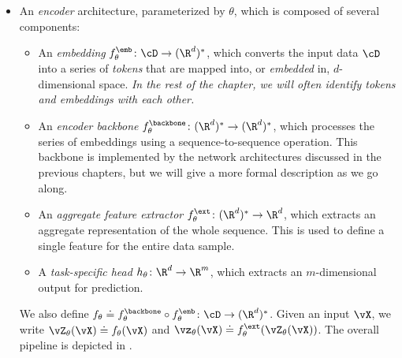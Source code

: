 \documentclass[../../book-main.tex]{subfiles}
\begin{document}
\begin{itemize}
    \item An \textit{encoder} architecture, parameterized by
        \(\theta\), which is composed of several components:
        \begin{itemize}
            \item An \textit{embedding} \(f_{\theta}^{\emb} \colon
                \cD \to (\R^{d})^{*}\), which converts the input data
                \(\cD\) into a series of \textit{tokens} that are
                mapped into, or \textit{embedded} in,
                \(d\)-dimensional space. \textit{In the rest of the
                    chapter, we will often identify tokens and embeddings
                with each other.}
            \item An \textit{encoder backbone}
                \(f_{\theta}^{\backbone} \colon (\R^{d})^{*} \to
                (\R^{d})^{*}\), 
                which processes the series of
                embeddings using a sequence-to-sequence operation.
                This backbone is implemented by the network
                architectures discussed in the previous chapters, but
                we will give a more formal description as we go along.
            \item An \textit{aggregate feature extractor}
                \(f_{\theta}^{\ext} \colon (\R^{d})^{*} \to \R^{d}\),
                which extracts an aggregate representation of the
                whole sequence. This is used to define a single
                feature for the entire data sample.
            \item A \textit{task-specific head} \(h_{\theta} \colon
                \R^{d} \to \R^{m}\), which extracts an
                \(m\)-dimensional output for prediction.
        \end{itemize}
        We also define \(f_{\theta} \doteq f_{\theta}^{\backbone}
        \circ f_{\theta}^{\emb} \colon \cD \to (\R^{d})^{*}\). Given
        an input \(\vX\), we write \(\vZ_{\theta}(\vX) \doteq
        f_{\theta}(\vX)\) and \(\vz_{\theta}(\vX) \doteq
        f_{\theta}^{\ext}(\vZ_{\theta}(\vX))\). The overall pipeline
        is depicted in .


\end{itemize}
\end{document}
